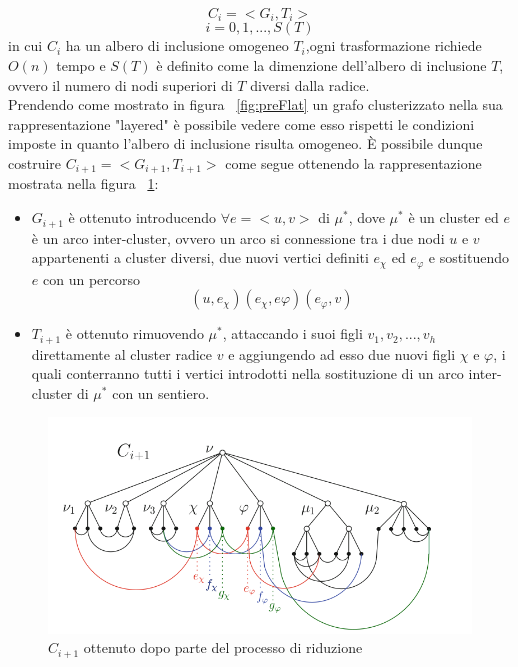 {$$C_i = <G_i, T_i>$$
$$i = 0, 1,. . . , S(T)$$
in cui $C_i$ ha un albero di inclusione omogeneo $T_i$,ogni trasformazione richiede $O(n)$ tempo e $S(T)$ è definito come la dimenzione dell'albero di inclusione $T$, ovvero il numero di nodi superiori di $T$ diversi dalla radice.\\
Prendendo come mostrato in figura \figurename~\ref{fig:preFlat} un grafo clusterizzato nella sua rappresentazione "layered" è possibile vedere come esso rispetti le condizioni imposte in quanto l'albero di inclusione risulta omogeneo. È possibile dunque costruire $C_{i+1} = <G_{i+1},T_{i+1}>$ come segue ottenendo la rappresentazione mostrata nella figura \figurename~\ref{fig:postFlat}:\\
\begin{itemize}
	\item \textbf{$ G_{i+1} $} è ottenuto introducendo $\forall e=<u,v>$ di $\mu^*$, dove $\mu^*$ è un cluster ed $e$ è un arco inter-cluster, ovvero un arco si connessione tra i due nodi $u$ e $v$ appartenenti a cluster diversi, due nuovi vertici definiti $e_\chi$ ed $e_\varphi$ e sostituendo $e$ con un percorso $$(u, e_\chi)(e_\chi, e\varphi) (e_\varphi, v)$$
	\item \textbf{$T_{i+1}$} è ottenuto rimuovendo $\mu^*$, attaccando i suoi figli $v_1, v_2,. . . , v_h$ direttamente al cluster radice $v$ e aggiungendo ad esso due nuovi figli $\chi$ e $\varphi$, i quali conterranno tutti i vertici introdotti nella sostituzione di un arco inter-cluster di  $\mu^*$ con un sentiero.
\end{itemize}
\begin{figure}[!htb]
	\begin{center}
		\includegraphics[width=1 \linewidth]{figure/postFlat}
	\end{center}
	\caption{$C_{i+1}$ ottenuto dopo parte del processo di riduzione \label{fig:postFlat}}
\end{figure}
}
